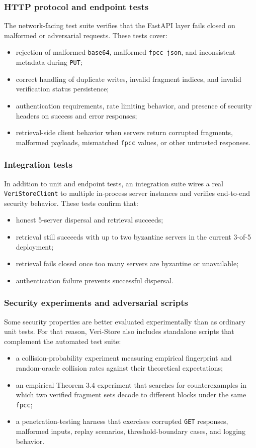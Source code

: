 \documentclass[../veristore_security_model.tex]{subfiles}
\begin{document}
\subsubsection{HTTP protocol and endpoint tests}
The network-facing test suite verifies that the FastAPI layer fails closed on malformed or adversarial requests. These tests cover:
\begin{itemize}
    \item rejection of malformed \texttt{base64}, malformed \texttt{fpcc\_json}, and inconsistent metadata during \texttt{PUT};
    \item correct handling of duplicate writes, invalid fragment indices, and invalid verification status persistence;
    \item authentication requirements, rate limiting behavior, and presence of security headers on success and error responses;
    \item retrieval-side client behavior when servers return corrupted fragments, malformed payloads, mismatched \texttt{fpcc} values, or other untrusted responses.
\end{itemize}

\subsubsection{Integration tests}
In addition to unit and endpoint tests, an integration suite wires a real \texttt{VeriStoreClient} to multiple in-process server instances and verifies end-to-end security behavior. These tests confirm that:
\begin{itemize}
    \item honest 5-server dispersal and retrieval succeeds;
    \item retrieval still succeeds with up to two byzantine servers in the current 3-of-5 deployment;
    \item retrieval fails closed once too many servers are byzantine or unavailable;
    \item authentication failure prevents successful dispersal.
\end{itemize}

\subsubsection{Security experiments and adversarial scripts}
Some security properties are better evaluated experimentally than as ordinary unit tests. For that reason, Veri-Store also includes standalone scripts that complement the automated test suite:
\begin{itemize}
    \item a collision-probability experiment measuring empirical fingerprint and random-oracle collision rates against their theoretical expectations;
    \item an empirical Theorem 3.4 experiment that searches for counterexamples in which two verified fragment sets decode to different blocks under the same \texttt{fpcc};
    \item a penetration-testing harness that exercises corrupted \texttt{GET} responses, malformed inputs, replay scenarios, threshold-boundary cases, and logging behavior.
\end{itemize}
\end{document}
